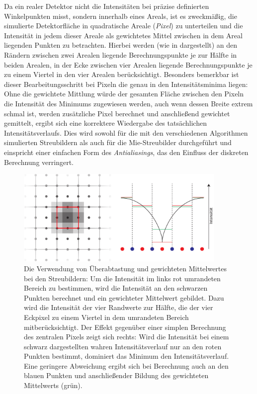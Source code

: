 Da ein realer Detektor nicht die Intensitäten bei präzise definierten Winkelpunkten misst, sondern innerhalb eines Areals, ist es zweckmäßig, die simulierte Detektorfläche in quadratische Areale (\textit{Pixel}) zu unterteilen und die Intensität in jedem dieser Areale als gewichtetes Mittel zwischen in dem Areal liegenden Punkten zu betrachten.
Hierbei werden (wie in  dargestellt) an den Rändern zwischen zwei Arealen liegende Berechnungspunkte je zur Hälfte in beiden Arealen, in der Ecke zwischen vier Arealen liegende Berechnungspunkte je zu einem Viertel in den vier Arealen berücksichtigt.
Besonders bemerkbar ist dieser Bearbeitungsschritt bei Pixeln die genau in den Intensitätsminima liegen: Ohne die gewichtete Mittlung würde der gesamten Fläche zwischen den Pixeln die Intensität des Minimums zugewiesen werden, auch wenn dessen Breite extrem schmal ist, werden zusätzliche Pixel berechnet und anschließend gewichtet gemittelt, ergibt sich eine korrektere Wiedergabe des tatsächlichen Intensitätsverlaufs. Dies wird sowohl für die mit den verschiedenen Algorithmen simulierten Streubildern als auch für die Mie-Streubilder durchgeführt und einspricht einer einfachen Form des \textit{Antialiasings}, das den Einfluss der diskreten Berechnung verringert.
\begin{figure} %
	\centering
	\includegraphics[width=0.9\textwidth]{images/average.pdf}
	\caption[Gewichteter Mittelwert]{Die Verwendung von Überabtastung und gewichteten Mittelwertes bei den Streubildern: Um die Intensität im links rot umrandeten Bereich zu bestimmen, wird die Intensität an den schwarzen Punkten berechnet und ein gewichteter Mittelwert gebildet. Dazu wird die Intensität der vier Randwerte zur Hälfte, die der vier Eckpixel zu einem Viertel in dem umrandeten Bereich mitberücksichtigt. Der Effekt gegenüber einer simplen Berechnung des zentralen Pixels zeigt sich rechts: Wird die Intensität bei einem schwarz dargestellten wahren Intensitätsverlauf nur an den roten Punkten bestimmt, dominiert das Minimum den Intensitätsverlauf. Eine geringere Abweichung ergibt sich bei Berechnung auch an den blauen Punkten und anschließender Bildung des gewichteten Mittelwerts (grün).}
	\label{fig:average}
\end{figure}%

